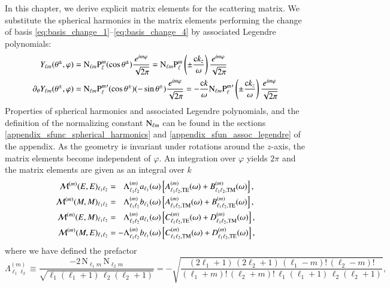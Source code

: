 In this chapter, we derive explicit matrix elements for the scattering matrix.
We substitute the spherical harmonics in the matrix elements performing the
change of basis \eqref{eq:basis_change_1}--\eqref{eq:basis_change_4} by
associated Legendre polynomials:
\begin{align}
Y_{\ell m}(\theta^\pm, \varphi) &= \text{N}_{\ell m} {\text{P}_{\ell}^{m}}(\cos\theta^\pm) \frac{e^{i m \varphi}}{\sqrt{2\pi}} = \text{N}_{\ell m} {\text{P}_{\ell}^{m}}\left(\pm \frac{\mathrm{c} k_z}{\omega}\right) \frac{e^{i m \varphi}}{\sqrt{2\pi}} \\
\partial_\theta Y_{\ell m}(\theta^\pm, \varphi) &= \text{N}_{\ell m} {\text{P}_{\ell}^{m}}^\prime(\cos\theta^\pm) (-\sin\theta^\pm) \frac{e^{i m \varphi}}{\sqrt{2\pi}} 
= - \frac{\mathrm{c} k}{\omega} \text{N}_{\ell m} {\text{P}_{\ell}^{m}}^\prime\left(\pm \frac{\mathrm{c} k_z}{\omega}\right) \frac{e^{i m \varphi}}{\sqrt{2\pi}} 
\end{align}
Properties of spherical harmonics and associated Legendre polynomials, and the
definition of the normalizing constant $\text{N}_{\ell m}$ can be found in the
sections \ref{appendix_sfunc_spherical_harmonics} and
\ref{appendix_sfun_assoc_legendre} of the appendix. As the geometry is
invariant under rotations around the $z$-axis, the matrix elements become
independent of $\varphi$. An integration over $\varphi$ yields $2\pi$ and the
matrix elements are given as an integral over $k$
\begin{align}
\mathcal{M}^{(m)}(E,E)_{\ell_1 \ell_2} &= \phantom{-}\Lambda^{(m)}_{\ell_1 \ell_2} a_{\ell_1}(\omega) \left[ A^{(m)}_{\ell_1 \ell_2,\mathrm{TE}}(\omega)+ B^{(m)}_{\ell_1 \ell_2, \mathrm{TM}}(\omega)\right], \\
\mathcal{M}^{(m)}(M,M)_{\ell_1 \ell_2} &= \phantom{-}\Lambda^{(m)}_{\ell_1 \ell_2} b_{\ell_1}(\omega) \left[ A^{(m)}_{\ell_1 \ell_2,\mathrm{TM}}(\omega)+ B^{(m)}_{\ell_1 \ell_2, \mathrm{TE}}(\omega)\right], \\
\mathcal{M}^{(m)}(E,M)_{\ell_1 \ell_2} &= \phantom{-}\Lambda^{(m)}_{\ell_1 \ell_2} a_{\ell_1}(\omega) \left[ C^{(m)}_{\ell_1 \ell_2,\mathrm{TE}}(\omega)+ D^{(m)}_{\ell_1 \ell_2, \mathrm{TM}}(\omega)\right], \\
\mathcal{M}^{(m)}(M,E)_{\ell_1 \ell_2} &= -\Lambda^{(m)}_{\ell_1 \ell_2} b_{\ell_1}(\omega) \left[ C^{(m)}_{\ell_1 \ell_2,\mathrm{TM}}(\omega)+ D^{(m)}_{\ell_1 \ell_2, \mathrm{TE}}(\omega)\right],
\end{align}
where we have defined the prefactor
\begin{equation}
\label{eq:4_lambda}
\Lambda_{\ell_1 \ell_2}^{(m)} \equiv \frac{-2 \, \mathrm{N}_{\ell_1 m}\,\mathrm{N}_{\ell_2 m}}{\sqrt{\ell_1 (\ell_1+1)\,\ell_2(\ell_2+1)}}
= -\sqrt{ \frac{(2\ell_1+1)\,(2\ell_2+1)\,(\ell_1-m)!\,(\ell_2-m)!}{(\ell_1+m)!\, (\ell_2+m)!\, \ell_1(\ell_1+1) \, \ell_2(\ell_2+1)} },
\end{equation}
